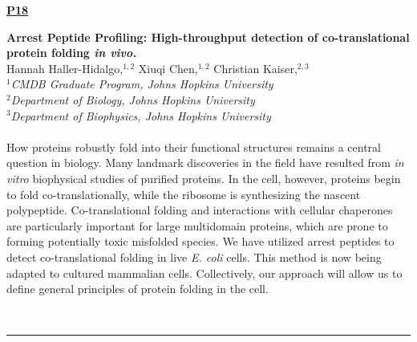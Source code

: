 \documentclass[titlepage,oneside,openany,10pt]{book}
\newenvironment{posterabs}[4] %
        {
	\begin{flushright}
                \underline{\textbf{#4}}
        \end{flushright}
        \textbf{#1}\\%
        #2\\%
        \textit{#3}\\\\%
        }
        {
        \\
        \noindent\rule{15cm}{0.5pt}%
        }
\begin{document}
\begin{posterabs}
	{Arrest Peptide Profiling: High-throughput detection of co-translational protein folding \emph{in vivo.}}
	{Hannah Haller-Hidalgo,$^{1,2}$ Xiuqi Chen,$^{1,2}$ Christian Kaiser,$^{2,3}$}
	{
	$^1$CMDB Graduate Program, Johns Hopkins University\\
	$^2$Department of Biology, Johns Hopkins University\\
	$^3$Department of Biophysics, Johns Hopkins University
	}
	{P18}
	How proteins robustly fold into their functional structures remains a central question in biology. Many landmark discoveries in the field have resulted from \emph{in vitro} biophysical studies of purified proteins. In the cell, however, proteins begin to fold co-translationally, while the ribosome is synthesizing the nascent polypeptide. Co-translational folding and interactions with cellular chaperones are particularly important for large multidomain proteins, which are prone to forming potentially toxic misfolded species. We have utilized arrest peptides to detect co-translational folding in live \emph{E. coli} cells. This method is now being adapted to cultured mammalian cells. Collectively, our approach will allow us to define general principles of protein folding in the cell.
	\label{Haller-hidalgoH}
\end{posterabs}

\vspace{1cm}
\end{document}
